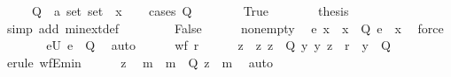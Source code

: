 \begin{isabellebody}
\ \ \ \ \ Q\ {\isacharcolon}{\kern0pt}{\isacharcolon}{\kern0pt}\ {\isachardoublequoteopen}{\isacharprime}{\kern0pt}a\ set\ set{\isachardoublequoteclose}\ \ x\isanewline
\ \ \isamarkupfalse%
\ {\isacharparenleft}{\kern0pt}cases\ {\isachardoublequoteopen}Q\ {\isacharequal}{\kern0pt}\ {\isacharbraceleft}{\kern0pt}{\isacharbraceleft}{\kern0pt}{\isacharbraceright}{\kern0pt}{\isacharbraceright}{\kern0pt}{\isachardoublequoteclose}{\isacharparenright}{\kern0pt}\isanewline
\ \ \ \ \isamarkupfalse%
\ True\isanewline
\ \ \ \ \isamarkupfalse%
\ \isamarkupfalse%
\ {\isacharquery}{\kern0pt}thesis\ \isamarkupfalse%
\ {\isacharparenleft}{\kern0pt}simp\ add{\isacharcolon}{\kern0pt}\ min{\isacharunderscore}{\kern0pt}ext{\isacharunderscore}{\kern0pt}def{\isacharparenright}{\kern0pt}\isanewline
\ \ \isamarkupfalse%
\isanewline
\ \ \ \ \isamarkupfalse%
\ False\isanewline
\ \ \ \ \isamarkupfalse%
\ nonempty\ \isamarkupfalse%
\ e\ x\ \ {\isachardoublequoteopen}x\ {\isasymin}\ Q{\isachardoublequoteclose}\ {\isachardoublequoteopen}e\ {\isasymin}\ x{\isachardoublequoteclose}\ \isamarkupfalse%
\ force\isanewline
\ \ \ \ \isamarkupfalse%
\ \isamarkupfalse%
\ eU{\isacharcolon}{\kern0pt}\ {\isachardoublequoteopen}e\ {\isasymin}\ {\isasymUnion}Q{\isachardoublequoteclose}\ \isamarkupfalse%
\ auto\isanewline
\ \ \ \ \isamarkupfalse%
\ {\isacartoucheopen}wf\ r{\isacartoucheclose}\isanewline
\ \ \ \ \isamarkupfalse%
\ z\ \ z{\isacharcolon}{\kern0pt}\ {\isachardoublequoteopen}z\ {\isasymin}\ {\isasymUnion}Q{\isachardoublequoteclose}\ {\isachardoublequoteopen}{\isasymAnd}y{\isachardot}{\kern0pt}\ {\isacharparenleft}{\kern0pt}y{\isacharcomma}{\kern0pt}\ z{\isacharparenright}{\kern0pt}\ {\isasymin}\ r\ {\isasymLongrightarrow}\ y\ {\isasymnotin}\ {\isasymUnion}Q{\isachardoublequoteclose}\isanewline
\ \ \ \ \ \ \isamarkupfalse%
\ {\isacharparenleft}{\kern0pt}erule\ wfE{\isacharunderscore}{\kern0pt}min{\isacharparenright}{\kern0pt}\isanewline
\ \ \ \ \isamarkupfalse%
\ z\ \isamarkupfalse%
\ m\ \ {\isachardoublequoteopen}m\ {\isasymin}\ Q{\isachardoublequoteclose}\ {\isachardoublequoteopen}z\ {\isasymin}\ m{\isachardoublequoteclose}\ \isamarkupfalse%
\ auto\isanewline
\ \ \ \ \isamarkupfalse%

\end{isabellebody}
